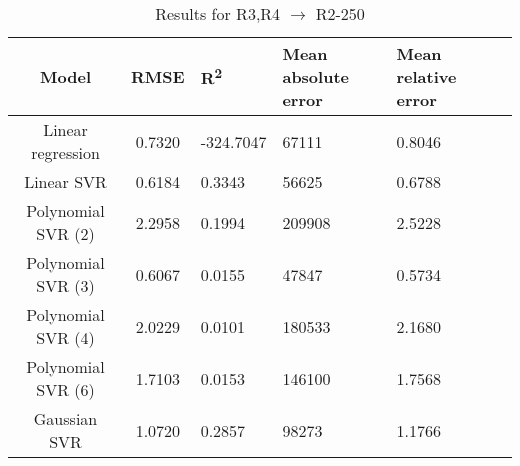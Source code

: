 \begin{table}[H]
\centering
\begin{adjustbox}{center}
\begin{tabular}{c | c M{1.2cm} M{2.5cm} M{2.5cm} M{1.8cm}}
Model & RMSE & R\textsuperscript{2} & Mean absolute error & Mean relative error \tabularnewline
\hline
Linear regression & 0.7320 & -324.7047 &  67111 & 0.8046 \\
Linear SVR & 0.6184 & 0.3343 &  56625 & 0.6788 \\
Polynomial SVR (2) & 2.2958 & 0.1994 & 209908 & 2.5228 \\
Polynomial SVR (3) & 0.6067 & 0.0155 &  47847 & 0.5734 \\
Polynomial SVR (4) & 2.0229 & 0.0101 & 180533 & 2.1680 \\
Polynomial SVR (6) & 1.7103 & 0.0153 & 146100 & 1.7568 \\
Gaussian SVR & 1.0720 & 0.2857 &  98273 & 1.1766 \\
\end{tabular}
\end{adjustbox}
\\
\caption{Results for R3,R4 $\rightarrow$ R2-250}
\label{tab:coreonly_linear_R3,R4_R2_250}
\end{table}
